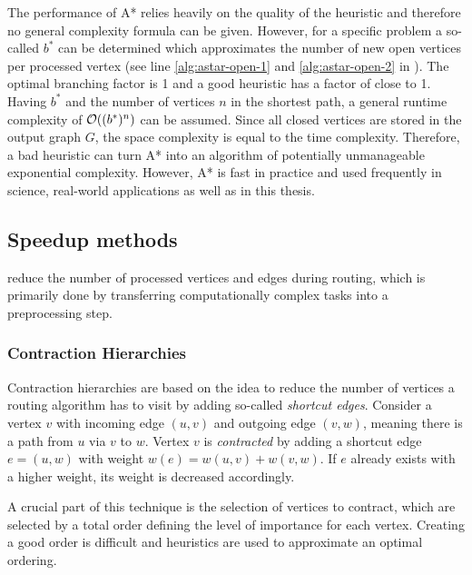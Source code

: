 			The performance of A* relies heavily on the quality of the heuristic and therefore no general complexity formula can be given\cite{russell-norvig-ai-modern-approach}.
			However, for a specific problem a so-called  $b^*$ can be determined which approximates the number of new open vertices per processed vertex (see line \ref{alg:astar-open-1} and \ref{alg:astar-open-2} in ).
			The optimal branching factor is 1 and a good heuristic has a factor of close to 1.
			Having $b^*$ and the number of vertices $n$ in the shortest path, a general runtime complexity of $\mathcal{O}((b^*)^n)$ can be assumed.
			Since all closed vertices are stored in the output graph $G$, the space complexity is equal to the time complexity.
			Therefore, a bad heuristic can turn A* into an algorithm of potentially unmanageable exponential complexity.
			However, A* is fast in practice and used frequently in science, real-world applications as well as in this thesis.
		
	\subsection{Speedup methods}
	\label{subsec:speedup-methods}
	
		 reduce the number of processed vertices and edges during routing, which is primarily done by transferring computationally complex tasks into a preprocessing step.
		
		\subsubsection{Contraction Hierarchies}
		\label{subsubsec:ch}
		
			Contraction hierarchies are based on the idea to reduce the number of vertices a routing algorithm has to visit by adding so-called \emph{shortcut edges}\cite{geisberger-contraction-hierarchies}.
			Consider a vertex $v$ with incoming edge $(u, v)$ and outgoing edge $(v, w)$, meaning there is a path from $u$ via $v$ to $w$.
			Vertex $v$ is \emph{contracted} by adding a shortcut edge $e = (u, w)$ with weight $w(e) = w(u, v) + w(v, w)$.
			If $e$ already exists with a higher weight, its weight is decreased accordingly.
			
			A crucial part of this technique is the selection of vertices to contract\cite[14]{geisberger-contraction-hierarchies}, which are selected by a total order defining the level of importance for each vertex.
			Creating a good order is difficult and heuristics are used to approximate an optimal ordering.
			
